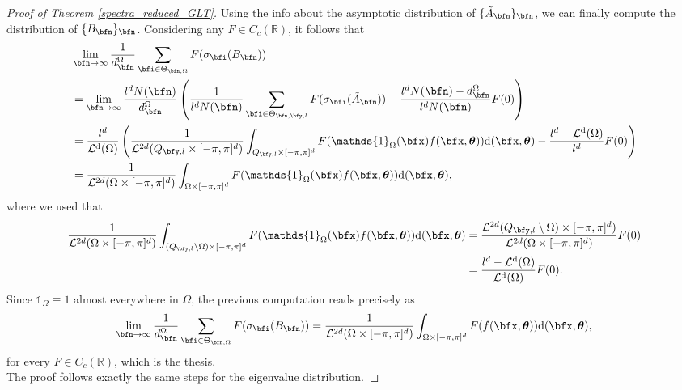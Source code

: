 \documentclass{amsart}
\DeclareMathOperator{\Ld}{\mathcal{L}^d}
\newcommand{\bftheta}{{\boldsymbol\theta}}
\begin{document}
\begin{proof}[Proof of Theorem \ref{spectra_reduced_GLT}]
    Using the info about the asymptotic distribution of $\{\tilde{A}_\bfn\}_\bfn$, we can finally compute the distribution of $\{B_\bfn\}_\bfn$. Considering any $F\in C_c(\mathbb{R})$, it follows that
    \begin{align*}
        &\lim\limits_{\bfn\to\infty}\frac1{d_\bfn^{\Omega}}\sum_{\bfi\in\Theta_{\bfn,\Omega}}F(\sigma_{\bfi}(B_\bfn))\\
        &=\lim\limits_{\bfn\to\infty}\frac{l^dN(\bfn)}{d_{\bfn}^{\Omega}}\left(\frac1{l^dN(\bfn)}\sum_{\bfi\in\Theta_{\bfn,\bfy,l}}F(\sigma_{\bfi}(\tilde{A}_\bfn))-\frac{l^dN(\bfn)-d_{\bfn}^{\Omega}}{l^dN(\bfn)}F(0)\right)\\
        &=\frac{l^d}{\Ld(\Omega)}\left(\frac{1}{\mathcal{L}^{2d}(Q_{\bfy,l}\times[-\pi,\pi]^d)}\int_{Q_{\bfy,l}\times[-\pi,\pi]^d}F(\mathds{1}_{\Omega}(\bfx)f(\bfx,\bftheta))\mathrm{d}(\bfx,\bftheta)-\frac{l^d-\Ld(\Omega)}{l^d}F(0)\right)\\
        &=\frac1{\mathcal{L}^{2d}(\Omega\times[-\pi,\pi]^d)}\int_{\Omega\times[-\pi,\pi]^d}F(\mathds{1}_{\Omega}(\bfx)f(\bfx,\bftheta))\mathrm{d}(\bfx,\bftheta),\\
    \end{align*}
    where we used that 
    \begin{align*}
        \frac1{\mathcal{L}^{2d}(\Omega\times[-\pi,\pi]^d)}\int_{(Q_{\bfy,l}\setminus\Omega)\times[-\pi,\pi]^d}F(\mathds{1}_{\Omega}(\bfx)f(\bfx,\bftheta))\mathrm{d}(\bfx,\bftheta)&=\frac{\mathcal{L}^{2d}(Q_{\bfy,l}\setminus\Omega)\times[-\pi,\pi]^d)}{\mathcal{L}^{2d}(\Omega\times[-\pi,\pi]^d)}F(0)\\
        &=\frac{l^d-\Ld(\Omega)}{\Ld(\Omega)}F(0).
    \end{align*}
    Since $\mathds{1}_{\Omega}\equiv 1$ almost everywhere in $\Omega$, the previous computation reads precisely as 
    \begin{equation*}
        \lim\limits_{\bfn\to\infty}\frac1{d_\bfn^{\Omega}}\sum_{\bfi\in\Theta_{\bfn,\Omega}}F(\sigma_{\bfi}(B_\bfn))=\frac1{\mathcal{L}^{2d}(\Omega\times[-\pi,\pi]^d)}\int_{\Omega\times[-\pi,\pi]^d}F(f(\bfx,\bftheta))\mathrm{d}(\bfx,\bftheta),
    \end{equation*}
    for every $F\in C_c(\mathbb{R})$, which is the thesis.\\
The proof follows exactly the same steps for the eigenvalue distribution.
\end{proof}
\end{document}
